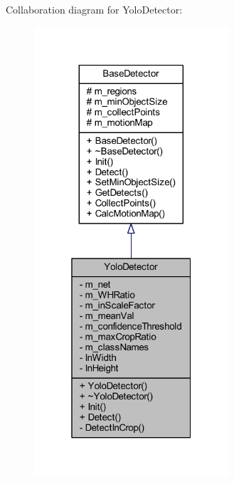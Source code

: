 Collaboration diagram for Yolo\+Detector\+:\nopagebreak
\begin{figure}[H]
\begin{center}
\leavevmode
\includegraphics[width=205pt]{class_yolo_detector__coll__graph}
\end{center}
\end{figure}
